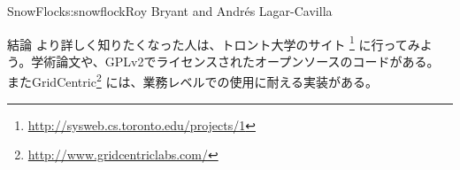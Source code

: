 \begin{aosachapter}{SnowFlock}{s:snowflock}{Roy Bryant and Andr\'e{s} Lagar-Cavilla}
\begin{aosasect1}{結論}
より詳しく知りたくなった人は、トロント大学のサイト
\footnote{\url{http://sysweb.cs.toronto.edu/projects/1}}
に行ってみよう。学術論文や、GPLv2でライセンスされたオープンソースのコードがある。
またGridCentric\footnote{\url{http://www.gridcentriclabs.com/}}
には、業務レベルでの使用に耐える実装がある。

\end{aosasect1}

\end{aosachapter}

